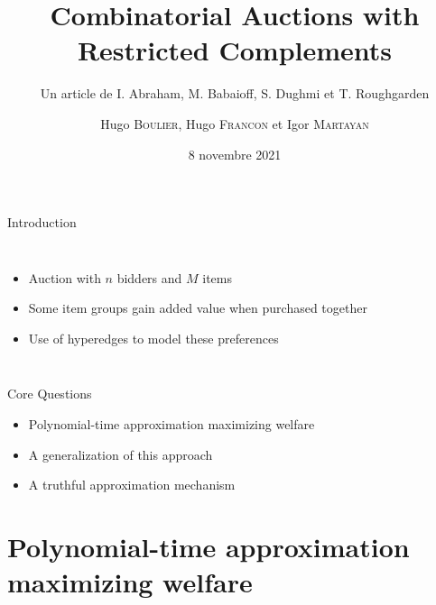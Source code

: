\documentclass[aspectratio=169]{beamer}
\title{Combinatorial Auctions with Restricted Complements}
\subtitle{Un article de I. Abraham, M. Babaioff, S. Dughmi et T. Roughgarden}
\author{Hugo \textsc{Boulier}, Hugo \textsc{Francon} et Igor \textsc{Martayan}}
\date{8 novembre 2021}
\begin{document}
{\maketitle}

\begin{frame}{Introduction}
    \begin{columns}
        \begin{itemize}
            \item Auction with $n$ bidders and $M$ items
            \item Some item groups gain added value when purchased together
            \item Use of hyperedges to model these preferences
        \end{itemize}

            \begin{figure}[H]
            \end{figure}

    \end{columns}
    
    
\end{frame}

\begin{frame}{Core Questions}
    \begin{itemize}
        \item Polynomial-time approximation maximizing welfare
        \item A generalization of this approach
        \item A truthful approximation mechanism
    \end{itemize}
\end{frame}

\section{Polynomial-time approximation maximizing welfare}
\end{document}
